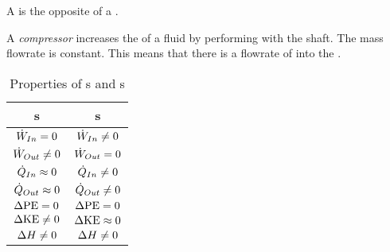 A  is the opposite of a .

\begin{definition}[Compressor]\label{def:Compressor}
  A \emph{compressor} increases the  of a fluid by performing  with the shaft.
  The mass flowrate is constant.
  This means that there is a flowrate of  into the .
\end{definition}

\begin{table}[h!tbp]
  \centering
  \begin{tabular}{cc}
    \toprule
    \nameref{def:Turbine}s & \nameref{def:Compressor}s \\
    \midrule
    $\dot{W}_{In} = 0$ & $\dot{W}_{In} \neq 0$ \\
    $\dot{W}_{Out} \neq 0$ & $\dot{W}_{Out} = 0$ \\
    $\dot{Q}_{In} \approx 0$ & $\dot{Q}_{In} \neq 0$ \\
    $\dot{Q}_{Out} \approx 0$ & $\dot{Q}_{Out} \neq 0$ \\
    $\Delta \mathrm{PE} = 0$ & $\Delta \mathrm{PE} = 0$ \\
    $\Delta \mathrm{KE} \neq 0$ & $\Delta \mathrm{KE} \approx 0$ \\
    $\Delta H \neq 0$ & $\Delta H \neq 0$ \\
    \bottomrule
  \end{tabular}
  \caption{Properties of s and s}
  \label{tab:Turbine_Compressor_Properties}
\end{table}


